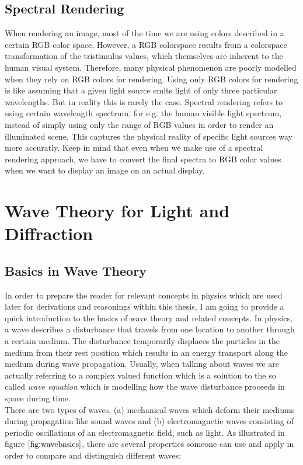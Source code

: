 \subsection{Spectral Rendering}
When rendering an image, most of the time we are using colors described in a certain RGB color space. However, a RGB colorspace results from a colorspace transformation of the tristimulus values, which themselves are inherent to the human visual system. Therefore, many physical phenomenon are poorly modelled when they rely on RGB colors for rendering. Using only RGB colors for rendering is like assuming that a given light source emits light of only three particular wavelengths. But in reality this is rarely the case. Spectral rendering refers to using certain wavelength spectrum, for e.g. the human visible light spectrum, instead of simply using only the range of RGB values in order to render an illuminated scene. This captures the physical reality of specific light sources way more accuratly. Keep in mind that even when we make use of a spectral rendering approach, we have to convert the final spectra to RGB color values when we want to display an image on an actual display. 

\section{Wave Theory for Light and Diffraction}
\subsection{Basics in Wave Theory}
In order to prepare the reader for relevant concepts in physics which are used later for derivations and reasonings within this thesis, I am going to provide a quick introduction to the basics of wave theory and related concepts. In physics, a wave describes a disturbance that travels from one location to another through a certain medium. The disturbance temporarily displaces the particles in the medium from their rest position which results in an energy transport along the medium during wave propagation. Usually, when talking about waves we are actually referring to a complex valued function which is a solution to the so called \emph{wave equation} which is modelling how the wave disturbance proceeds in space during time. \\

There are two types of waves, (a) mechanical waves which deform their mediums during propagation like sound waves and (b) electromagnetic waves consisting of periodic oscillations of an electromagnetic field, such as light. As illustrated in figure $\ref{fig:wavebasics}$, there are several properties someone can use and apply in order to compare and distinguish different waves:

